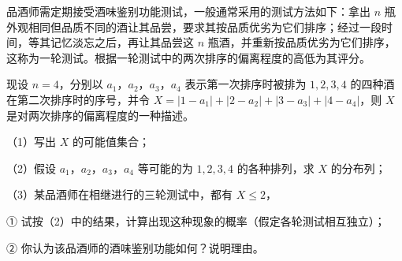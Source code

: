 \begin{question}
品酒师需定期接受酒味鉴别功能测试，一般通常采用的测试方法如下：拿出 $n$ 瓶外观相同但品质不同的酒让其品尝，要求其按品质优劣为它们排序；经过一段时间，等其记忆淡忘之后，再让其品尝这 $n$ 瓶酒，并重新按品质优劣为它们排序，这称为一轮测试。根据一轮测试中的两次排序的偏离程度的高低为其评分。

现设 $n=4$，分别以 $a_1$，$a_2$，$a_3$，$a_4$ 表示第一次排序时被排为 $1,2,3,4$ 的四种酒在第二次排序时的序号，并令 $X=|1-a_1|+|2-a_2|+|3-a_3|+|4-a_4|$，则 $X$ 是对两次排序的偏离程度的一种描述。

（1）写出 $X$ 的可能值集合；

（2）假设 $a_1$，$a_2$，$a_3$，$a_4$ 等可能的为 $1,2,3,4$ 的各种排列，求 $X$ 的分布列；

（3）某品酒师在相继进行的三轮测试中，都有 $X\leqslant2$，

① 试按（2）中的结果，计算出现这种现象的概率（假定各轮测试相互独立）；

② 你认为该品酒师的酒味鉴别功能如何？说明理由。

\end{question}